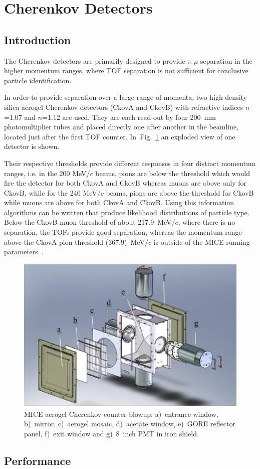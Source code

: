 \graphicspath{{03-Ckov/Figures/}}

\section{Cherenkov Detectors}
\label{Sect:Ckov}

\subsection{Introduction}
\label{SubSect:Ckov_Intro}

The Cherenkov detectors are primarily designed to provide $\pi$-$\mu$ separation in the higher momentum ranges, where TOF separation is not sufficient for conclusive particle identification.

In order to provide separation over a large range of momenta, two high density silica aerogel Cherenkov detectors (CkovA and CkovB) with refractive indices $n$=1.07 and $n$=1.12 are used.
They are each read out by four 200~mm photomultiplier tubes and placed directly one after another in the beamline, located just after the first TOF counter. In~Fig.~\ref{fig:Ckov} an exploded view of one detector is shown.

Their respective thresholds provide different responses in four distinct momentum ranges, i.e. in the 200 MeV/$c$ beams, pions are below the threshold which would fire the detector for both CkovA and CkovB whereas muons are above only for CkovB, while for the 240 MeV/$c$ beams, pions are above the threshold for CkovB while muons are above for both CkovA and CkovB. Using this information algorithms can be written that produce likelihood distributions of particle type.
Below the CkovB muon threshold of about 217.9~MeV/$c$, where there is no separation, the TOFs provide good separation, whereas the momentum range above the CkovA pion threshold (367.9)~MeV/$c$ is outside of the MICE running parameters~\cite{NOTE473}.
\begin{figure}
  \begin{center}
    \includegraphics[width=0.6\columnwidth]{./03-Ckov/Figures/Ckov.png}
    \caption{MICE aerogel Cherenkov counter blowup: a)~entrance window, b)~mirror, c)~aerogel mosaic, d)~acetate window, e)~GORE reflector panel, f)~exit window and g)~8~inch PMT in iron shield.}
    \label{fig:Ckov}
  \end{center}
\end{figure}

\subsection{Performance}
\label{SubSect:Ckov_Performance}
